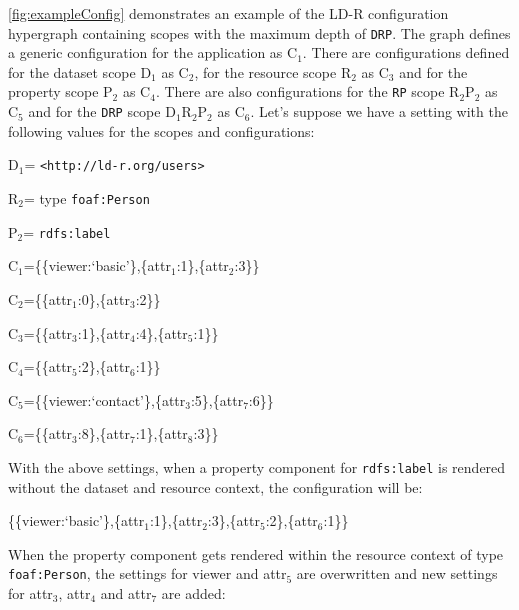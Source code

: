 \documentclass{acm_proc_article-sp}
\begin{document}
\autoref{fig:exampleConfig} demonstrates an example of the LD-R configuration hypergraph containing scopes with the maximum depth of \texttt{DRP}.
The graph defines a generic configuration for the application as C$_{\text{1}}$.
There are configurations defined for the dataset scope D$_{\text{1}}$ as C$_{\text{2}}$, for the resource scope R$_{\text{2}}$ as C$_{\text{3}}$ and for the property scope P$_{\text{2}}$ as C$_{\text{4}}$.
There are also configurations for the \texttt{RP} scope R$_{\text{2}}$P$_{\text{2}}$ as C$_{\text{5}}$ and for the \texttt{DRP} scope D$_{\text{1}}$R$_{\text{2}}$P$_{\text{2}}$ as C$_{\text{6}}$.
Let's suppose we have a setting with the following values for the scopes and configurations:
\begin{compactitem}

\item
D$_{\text{1}}$= \texttt{<http://ld-r.org/users>}
\item
R$_{\text{2}}$= type \texttt{foaf:Person}
\item
P$_{\text{2}}$= \texttt{rdfs:label}
\item
C$_{\text{1}}$=\{\{viewer:`basic'\},\{attr$_{\text{1}}$:1\},\{attr$_{\text{2}}$:3\}\}
\item
C$_{\text{2}}$=\{\{attr$_{\text{1}}$:0\},\{attr$_{\text{3}}$:2\}\}
\item
C$_{\text{3}}$=\{\{attr$_{\text{3}}$:1\},\{attr$_{\text{4}}$:4\},\{attr$_{\text{5}}$:1\}\}
\item
C$_{\text{4}}$=\{\{attr$_{\text{5}}$:2\},\{attr$_{\text{6}}$:1\}\}
\item
C$_{\text{5}}$=\{\{viewer:`contact'\},\{attr$_{\text{3}}$:5\},\{attr$_{\text{7}}$:6\}\}
\item
C$_{\text{6}}$=\{\{attr$_{\text{3}}$:8\},\{attr$_{\text{7}}$:1\},\{attr$_{\text{8}}$:3\}\}
\end{compactitem}

With the above settings, when a property component for \texttt{rdfs:label} is rendered without the dataset and resource context, the configuration will be:

 \{\{viewer:`basic'\},\{attr$_{\text{1}}$:1\},\{attr$_{\text{2}}$:3\},\{attr$_{\text{5}}$:2\},\{attr$_{\text{6}}$:1\}\} 
 
When the property component gets rendered within the resource context of type \texttt{foaf:Person}, the settings for viewer and attr$_{\text{5}}$ are overwritten and new settings for attr$_{\text{3}}$, attr$_{\text{4}}$ and attr$_{\text{7}}$ are added:
\end{document}
